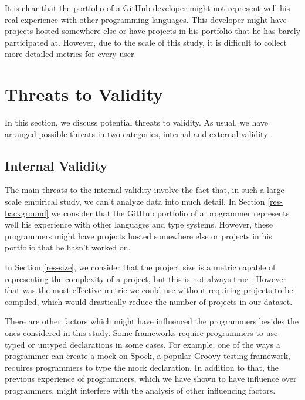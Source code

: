 \documentclass[preprint]{sigplanconf}
\begin{document}
It is clear that the portfolio of a GitHub developer might not represent well his real experience with other programming languages.
This developer might have projects hosted somewhere else or have projects in his portfolio that he has barely participated at.
However, due to the scale of this study, it is difficult to collect more detailed metrics for every user.











%
%
\section{Threats to Validity\label{threats}}
In this section, we discuss potential threats to validity. As usual, we have arranged possible threats in two categories, internal and external validity \cite{Wohlin2012}. 

\subsection*{Internal Validity}
The main threats to the internal validity involve the fact that, in such a large scale empirical study, we can't analyze data into much detail. In Section \ref{res-background} we consider that the GitHub portfolio of a programmer represents well his experience with other languages and type systems.
However, these programmers might have projects hosted somewhere else or projects in his portfolio that he hasn't worked on.

In Section \ref{res-size}, we consider that the project size is a metric capable of representing the complexity of a project, but this is not always true \cite{Fenton1998}.
However that was the most effective metric we could use without requiring projects to be compiled, which would drastically reduce the number of projects in our dataset.

There are other factors which might have influenced the programmers besides the ones considered in this study.
Some frameworks require programmers to use typed or untyped declarations in some cases.
For example, one of the ways a programmer can create a mock on Spock, a popular Groovy testing framework, requires programmers to type the mock declaration.
In addition to that, the previous experience of programmers, which we have shown to have influence over programmers, might interfere with the analysis of other influencing factors.
\end{document}
